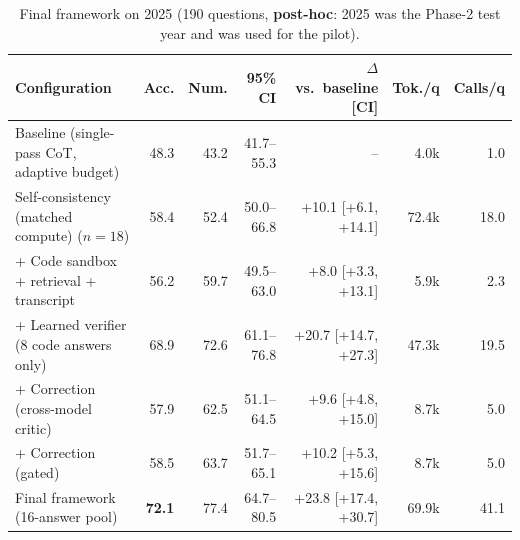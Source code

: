 \begin{table}[!t]
\centering
\footnotesize
\caption{Final framework on 2025 (190 questions, \textbf{post-hoc}: 2025 was the Phase-2 test year and was used for the pilot).}
\label{tab:t25}
\setlength{\tabcolsep}{3.5pt}
\begin{tabular}{lrrrrrr}
\toprule
Configuration & Acc. & Num. & 95\% CI & $\Delta$ vs.\ baseline [CI] & Tok./q & Calls/q \\
\midrule
Baseline (single-pass CoT, adaptive budget) & 48.3 & 43.2 & 41.7--55.3 & -- & 4.0k & 1.0 \\
Self-consistency (matched compute) ($n{=}18$) & 58.4 & 52.4 & 50.0--66.8 & +10.1 [+6.1, +14.1] & 72.4k & 18.0 \\
+ Code sandbox + retrieval + transcript & 56.2 & 59.7 & 49.5--63.0 & +8.0 [+3.3, +13.1] & 5.9k & 2.3 \\
+ Learned verifier (8 code answers only) & 68.9 & 72.6 & 61.1--76.8 & +20.7 [+14.7, +27.3] & 47.3k & 19.5 \\
+ Correction (cross-model critic) & 57.9 & 62.5 & 51.1--64.5 & +9.6 [+4.8, +15.0] & 8.7k & 5.0 \\
+ Correction (gated) & 58.5 & 63.7 & 51.7--65.1 & +10.2 [+5.3, +15.6] & 8.7k & 5.0 \\
Final framework (16-answer pool) & \textbf{72.1} & 77.4 & 64.7--80.5 & +23.8 [+17.4, +30.7] & 69.9k & 41.1 \\
\bottomrule
\end{tabular}
\end{table}
